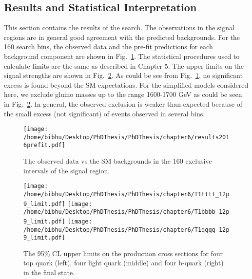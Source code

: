 \subsection{Results and Statistical Interpretation}
This section contains the results of the search. The observations in the signal regions are in 
general good agreement with the predicted backgrounds. For the 160
search bins, the observed data and the pre-fit predictions for each background
component are shown in Fig.~\ref{fig:DataVsBkg2016}. The statistical procedures used to calculate limits are the same as described in  Chapter 5. The upper limits on the signal strengths are shown in Fig.~\ref{fig:Limit2016}. As could be see from Fig.~\ref{fig:DataVsBkg2016}, no significant excess is found beyond the SM expectations. For the simplified models considered here, we exclude gluino masses up to the range 1600-1700 GeV as could be seen in Fig.~\ref{fig:Limit2016}. In general, the observed exclusion is weaker than expected because of the small excess (not significant) of events observed in several bins. 

\begin{figure}[h]
\centering
\texttt{[image: /home/bibhu/Desktop/PhDThesis/PhDThesis/chapter6/results2016prefit.pdf]}
\caption{\label{fig:DataVsBkg2016}The observed data vs the SM backgrounds in the 160 exclusive intervals of the signal region. }
\end{figure}



\begin{figure}[h]
\centering
\texttt{[image: /home/bibhu/Desktop/PhDThesis/PhDThesis/chapter6/T1tttt\_12p9\_limit.pdf]}
\texttt{[image: /home/bibhu/Desktop/PhDThesis/PhDThesis/chapter6/T1bbbb\_12p9\_limit.pdf]}
\texttt{[image: /home/bibhu/Desktop/PhDThesis/PhDThesis/chapter6/T1qqqq\_12p9\_limit.pdf]}
\caption{\label{fig:Limit2016}The 95\% CL upper limits on the production cross sections for four top quark (left), four light quark (middle) and four b-quark (right) in the final state. }
\end{figure}










